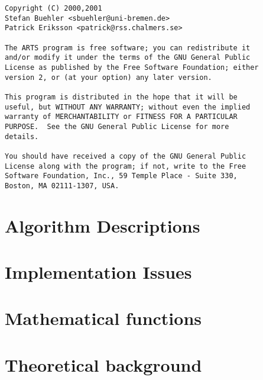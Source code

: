 \newpage                          
\thispagestyle{empty}
\vspace*{\fill}
\noindent
\begin{verbatim}
Copyright (C) 2000,2001 
Stefan Buehler <sbuehler@uni-bremen.de>
Patrick Eriksson <patrick@rss.chalmers.se>

The ARTS program is free software; you can redistribute it
and/or modify it under the terms of the GNU General Public
License as published by the Free Software Foundation; either
version 2, or (at your option) any later version.

This program is distributed in the hope that it will be
useful, but WITHOUT ANY WARRANTY; without even the implied
warranty of MERCHANTABILITY or FITNESS FOR A PARTICULAR
PURPOSE.  See the GNU General Public License for more
details. 

You should have received a copy of the GNU General Public
License along with the program; if not, write to the Free
Software Foundation, Inc., 59 Temple Place - Suite 330,
Boston, MA 02111-1307, USA. 
\end{verbatim}
\cleardoublepage

\tableofcontents

\cleardoublepage
{}
     

%
%



%
\part{Algorithm Descriptions}


%

%

%
%
%
%
% 
\part{Implementation Issues}


\part{Mathematical functions}



\part{Theoretical background}


%
%


